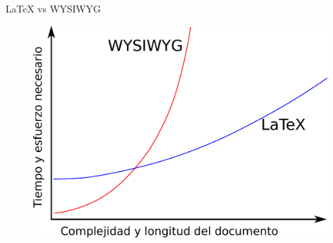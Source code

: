 \documentclass[11pt]{beamer}
\begin{document}
\begin{frame}{\LaTeX{} vs WYSIWYG}
\begin{figure}
\centering
\includegraphics[width=\textwidth]{figs/latex-vs-wysiwyg.pdf}
\end{figure}
\end{frame}
\end{document}
